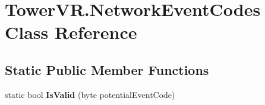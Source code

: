 \hypertarget{class_tower_v_r_1_1_network_event_codes}{}\section{Tower\+V\+R.\+Network\+Event\+Codes Class Reference}
\label{class_tower_v_r_1_1_network_event_codes}
\subsection*{Static Public Member Functions}
\begin{DoxyCompactItemize}
\item 
static bool {\bfseries Is\+Valid} (byte potential\+Event\+Code)\hypertarget{class_tower_v_r_1_1_network_event_codes_afa0cc00d304b6dfacbb1903d80e0ec52}{}\label{class_tower_v_r_1_1_network_event_codes_afa0cc00d304b6dfacbb1903d80e0ec52}

\end{DoxyCompactItemize}

